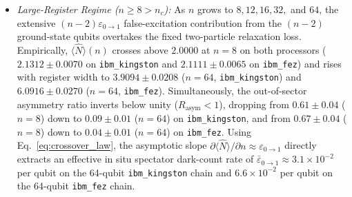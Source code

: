 \documentclass[aps,pra,reprint,superscriptaddress,floatfix,nofootinbib]{revtex4-2}
\begin{document}
\begin{enumerate}
\begin{itemize}
        \item \emph{Large-Register Regime ($n \ge 8 > n_c$):} As $n$ grows to $8, 12, 16, 32,$ and $64$, the extensive $(n - 2)\varepsilon_{0\to 1}$ false-excitation contribution from the $(n - 2)$ ground-state qubits overtakes the fixed two-particle relaxation loss. Empirically, $\langle \hat{N} \rangle(n)$ crosses above $2.0000$ at $n = 8$ on both processors ($2.1312 \pm 0.0070$ on \texttt{ibm\_kingston} and $2.1111 \pm 0.0065$ on \texttt{ibm\_fez}) and rises with register width to $3.9094 \pm 0.0208$ ($n = 64$, \texttt{ibm\_kingston}) and $6.0916 \pm 0.0270$ ($n = 64$, \texttt{ibm\_fez}). Simultaneously, the out-of-sector asymmetry ratio inverts below unity ($R_{\text{asym}} < 1$), dropping from $0.61 \pm 0.04$ ($n = 8$) down to $0.09 \pm 0.01$ ($n = 64$) on \texttt{ibm\_kingston}, and from $0.67 \pm 0.04$ ($n = 8$) down to $0.04 \pm 0.01$ ($n = 64$) on \texttt{ibm\_fez}. Using Eq.~\eqref{eq:crossover_law}, the asymptotic slope $\partial \langle \hat{N} \rangle / \partial n \approx \varepsilon_{0\to 1}$ directly extracts an effective in situ spectator dark-count rate of $\bar{\varepsilon}_{0\to 1} \approx 3.1 \times 10^{-2}$ per qubit on the 64-qubit \texttt{ibm\_kingston} chain and $6.6 \times 10^{-2}$ per qubit on the 64-qubit \texttt{ibm\_fez} chain.
    \end{itemize}


\end{enumerate}
\end{document}
